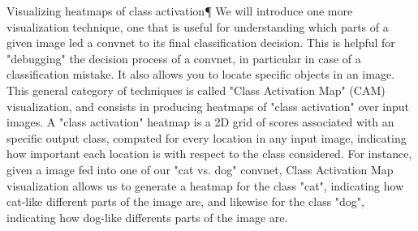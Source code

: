 Visualizing heatmaps of class activation¶
We will introduce one more visualization technique, one that is useful for understanding which parts of a given image led a convnet to its final classification decision. This is helpful for "debugging" the decision process of a convnet, in particular in case of a classification mistake. It also allows you to locate specific objects in an image.
This general category of techniques is called "Class Activation Map" (CAM) visualization, and consists in producing heatmaps of "class activation" over input images. A "class activation" heatmap is a 2D grid of scores associated with an specific output class, computed for every location in any input image, indicating how important each location is with respect to the class considered. For instance, given a image fed into one of our "cat vs. dog" convnet, Class Activation Map visualization allows us to generate a heatmap for the class "cat", indicating how cat-like different parts of the image are, and likewise for the class "dog", indicating how dog-like differents parts of the image are.
\fi

